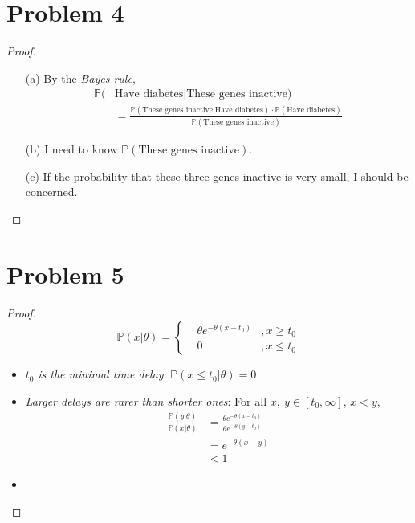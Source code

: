 \documentclass{article}
\begin{document}
\section*{Problem 4}
    \begin{proof}
        \indent
        \begin{itemize}
            \item[(a)]
                By the \textit{Bayes rule},
                \begin{align*}
                    \mathbb{P}(&\text{Have diabetes}|\text{These genes inactive})\\
                    &= \frac{\mathbb{P}(\text{These genes inactive}|\text{Have diabetes})\cdot \mathbb{P}(\text{Have diabetes})}{\mathbb{P}(\text{These genes inactive})}
                \end{align*}
            \item[(b)]
            I need to know $\mathbb{P}(\text{These genes inactive})$.
            \item[(c)]
                If the probability that these three genes inactive is very small,
                I should be concerned.
        \end{itemize}
    \end{proof}

\section*{Problem 5}
    \begin{proof}
        \begin{equation*}
            \mathbb{P}(x|\theta)=\left\{
                \begin{array}{rcl}
                &\theta e^{-\theta(x-t_0)} & ,{x \geqslant t_0}\\
                &0 & ,{x \leqslant t_0}
                \end{array} \right.
        \end{equation*}
        \begin{itemize}
            \item $t_0$ \textit{is the minimal time delay}:
                    $\mathbb{P}(x\leqslant t_0|\theta) = 0$
            \item \textit{Larger delays are rarer than shorter ones}:
                    For all $x,\ y\in [t_0,\infty]$, $x<y$,
                    \begin{align*}
                        \frac{\mathbb{P}(y|\theta)}{\mathbb{P}(x|\theta)}
                        &=\frac{\theta e^{-\theta(x-t_0)}}{\theta e^{-\theta(y-t_0)}}\\
                        &=e^{-\theta(x-y)}\\
                        &<1
                    \end{align*}
            \item 
        \end{itemize}
    \end{proof}
\end{document}
